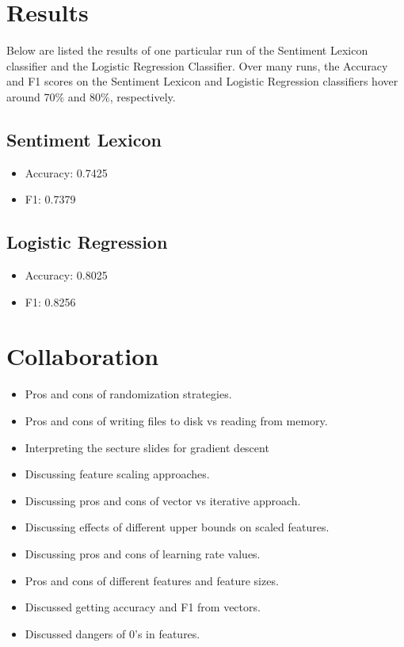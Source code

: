 \section{Results}

Below are listed the results of one particular run of the Sentiment Lexicon classifier and the Logistic Regression Classifier. Over many runs, the Accuracy and F1 scores on the Sentiment Lexicon and Logistic Regression classifiers hover around 70\% and 80\%, respectively. 

\subsection*{Sentiment Lexicon}
\begin{itemize}
    \item Accuracy: 0.7425
    \item F1: 0.7379
\end{itemize}

\subsection*{Logistic Regression}
\begin{itemize}
    \item Accuracy: 0.8025
    \item F1: 0.8256
\end{itemize}

\section{Collaboration}

\begin{itemize}
    \item Pros and cons of randomization strategies.
    \item Pros and cons of writing files to disk vs reading from memory.
    \item Interpreting the secture slides for gradient descent
    \item Discussing feature scaling approaches.
    \item Discussing pros and cons of vector vs iterative approach.
    \item Discussing effects of different upper bounds on scaled features.
    \item Discussing pros and cons of learning rate values.
    \item Pros and cons of different features and feature sizes.
    \item Discussed getting accuracy and F1 from vectors. 
    \item Discussed dangers of 0's in features.
\end{itemize}
